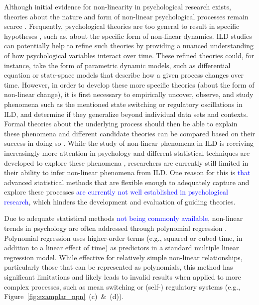 \documentclass[man, floatsintext]{apa7}
\begin{document}
Although initial evidence for non-linearity in psychological research exists,
theories about the nature and form of non-linear psychological processes remain
scarce \parencite{tan_time-varying_2011}. Frequently, psychological theories
are too general to result in specific hypotheses
\parencite{oberauer_addressing_2019}, such as, about the specific
form of non-linear dynamics. ILD studies can potentially help to refine such
theories by providing a nuanced understanding of how psychological variables
interact over time. These refined theories could, for instance, take the form
of parametric dynamic models, such as differential equation
\parencite{cooper_dynamical_2012} or state-space models
\parencite{durbin_time_2012} that describe how a given process changes over
time. However, in order to develop these more specific theories (about the form
of non-linear change), it is first necessary to empirically uncover, observe,
and study phenomena such as the mentioned state switching or regulatory
oscillations in ILD, and determine if they generalize beyond individual data
sets and contexts. Formal theories about the underlying process should then be
able to explain these phenomena and different candidate theories can be
compared based on their success in doing so \parencite{borsboom_theory_2021}.
While the study of non-linear phenomena in ILD is receiving increasingly more
attention in psychology and different statistical techniques are developed to
explore these phenomena \parencite{cui_unlocking_2023,humberg_estimating_2024},
researchers are currently still limited in their ability to infer non-linear
phenomena from ILD\@. One reason for this is \textcolor{blue}{that} advanced
statistical methods that are flexible enough to adequately capture and explore
these processes \textcolor{blue}{are currently not well established in
  psychological research}, which hinders the development and evaluation of
guiding theories.

Due to adequate statistical methods \textcolor{blue}{not being commonly
  available}, non-linear trends in psychology are often addressed through
polynomial regression \parencite{jebb_time_2015}. Polynomial regression uses
higher-order terms (e.g., squared or cubed time, in addition to a linear
effect of time) as predictors in a standard multiple linear regression model.
While effective for relatively simple non-linear relationships, particularly
those that can be represented as polynomials, this method has significant
limitations and likely leads to invalid results when applied to more complex
processes, such as mean switching or (self-) regulatory systems (e.g.,
Figure~\ref{fig:examplar_npn}~(c)~\&~(d)).
\end{document}
